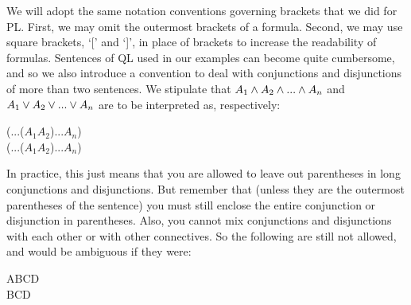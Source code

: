 We will adopt the same notation conventions governing brackets that we did for PL. First, we may omit the outermost brackets of a formula. Second, we may use square brackets, ‘[’ and ‘]’, in place of brackets to increase the readability of formulas. Sentences of QL used in our examples can become quite cumbersome, and so we also introduce a convention to deal with conjunctions and disjunctions of more than two sentences. We stipulate that $A_1\wedge A_2 \wedge ...\wedge A_n$ and $A_1\vee A_2\vee ...\vee A_n$ are to be interpreted as, respectively:
\begin{center}
(...($A_1$\eand $A_2$)\eand ...\eand $A_n$)\\
(...($A_1$\eor $A_2$)\eor ...\eor $A_n$)
\end{center}
In practice, this just means that you are allowed to leave out parentheses in long conjunctions and disjunctions. But remember that (unless they are the outermost parentheses of the sentence) you must still enclose the entire conjunction or disjunction in parentheses. Also, you cannot mix conjunctions and disjunctions with each other or with other connectives. So the following are still not allowed, and would be ambiguous if they were:
\begin{center}
A\eor B\eand C\eand D\\
B\eor C\eif D
\end{center}

\setcounter{seccount}{1}
